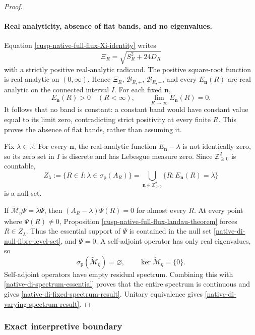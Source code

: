 \begin{proof}
\paragraph{Real analyticity, absence of flat bands, and no eigenvalues.}
Equation \eqref{cusp-native-full-flux-Xi-identity} writes
\[
 \Xi_R=\sqrt{S_R^2+24D_R}
\]
with a strictly positive real-analytic radicand.  The positive square-root
function is real analytic on \((0,\infty)\).  Hence
\(\Xi_R\), \(\mathcal B_{R,+}\), \(\mathcal B_{R,-}\), and every
\(E_{\mathbf n}(R)\) are real analytic on the connected interval \(I\).
For each fixed \(\mathbf n\),
\[
 E_{\mathbf n}(R)>0\quad(R<\infty),
 \qquad
 \lim_{R\to\infty}E_{\mathbf n}(R)=0.
\]
It follows that no band is constant: a constant band would have constant
value equal to its limit zero, contradicting strict positivity at every
finite \(R\).  This proves the absence of flat bands, rather than assuming
it.

Fix \(\lambda\in\mathbb R\).  For every \(\mathbf n\), the real-analytic
function \(E_{\mathbf n}-\lambda\) is not identically zero, so its zero set
in \(I\) is discrete and has Lebesgue measure zero.  Since
\(\mathbb Z_{\ge0}^2\) is countable,
\begin{equation}
 Z_\lambda
 :=\{R\in I:\lambda\in\sigma_{\mathrm p}(A_R)\}
 =\bigcup_{\mathbf n\in\mathbb Z_{\ge0}^2}
   \{R:E_{\mathbf n}(R)=\lambda\}
\label{native-di-null-fibre-level-set}
\end{equation}
is a null set.

If
\(\widetilde{\mathscr M}_\eta\Psi=\lambda\Psi\), then
\((A_R-\lambda)\Psi(R)=0\) for almost every \(R\).  At every point where
\(\Psi(R)\ne0\), Proposition
\ref{cusp-native-full-flux-landau-theorem} forces \(R\in Z_\lambda\).
Thus the essential support of \(\Psi\) is contained in the null set
\eqref{native-di-null-fibre-level-set}, and \(\Psi=0\).  A self-adjoint
operator has only real eigenvalues, so
\[
 \sigma_{\mathrm p}(\widetilde{\mathscr M}_\eta)=\varnothing,
 \qquad
 \ker\widetilde{\mathscr M}_\eta=\{0\}.
\]
Self-adjoint operators have empty residual spectrum.  Combining this with
\eqref{native-di-spectrum-essential} proves that the entire spectrum is
continuous and gives \eqref{native-di-fixed-spectrum-result}.  Unitary
equivalence gives \eqref{native-di-varying-spectrum-result}.
\end{proof}

\subsubsection{Exact interpretive boundary}

